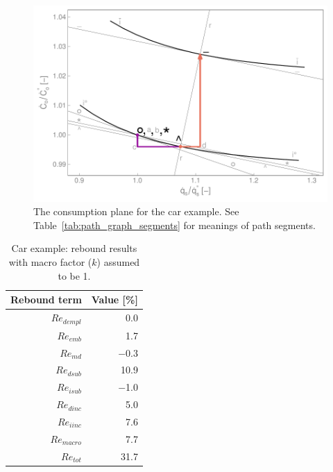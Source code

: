\documentclass[12pt]{article}\usepackage[]{graphicx}\usepackage[]{xcolor}
\makeatletter
\def\maxwidth{ %
  \ifdim\Gin@nat@width>\linewidth
    \linewidth
  \else
    \Gin@nat@width
  \fi
}
\newenvironment{knitrout}{}{} %
\makeatother
\begin{document}
\begin{knitrout}
\color{fgcolor}\begin{figure}

{\centering \includegraphics[width=\maxwidth]{figure/CarConsGraph-1} 

}

\caption{The consumption plane for the car example. See Table~\ref{tab:path_graph_segments} for meanings of path segments.}\label{fig:CarConsGraph}
\end{figure}

\end{knitrout}



\begin{table}[ht]
\centering
\caption{Car example: rebound results with macro factor ($k$) assumed to be 1.} 
\label{tab:car_results}
\begingroup\footnotesize
\begin{tabular}{rr}
  \toprule
Rebound term & Value [\%] \\ 
  \midrule
$Re_{dempl}$ & 0.0 \\ 
  $Re_{emb}$ & 1.7 \\ 
  $Re_{md}$ & $-$0.3 \\ 
  $Re_{dsub}$ & 10.9 \\ 
  $Re_{isub}$ & $-$1.0 \\ 
  $Re_{dinc}$ & 5.0 \\ 
  $Re_{iinc}$ & 7.6 \\ 
  $Re_{macro}$ & 7.7 \\ 
   \midrule
$Re_{tot}$ & 31.7 \\ 
   \bottomrule
\end{tabular}
\endgroup
\end{table}
\end{document}
